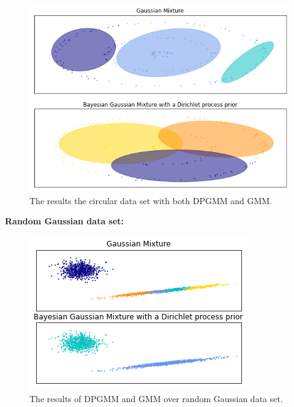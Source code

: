 \documentclass[12pt, a4paper]{paper}
\begin{document}
\begin{figure}[h!]
\centering
\includegraphics[scale=0.5]{cir_DPGMM.png}
\caption{The results the circular data set with both DPGMM and GMM.}
\label{fig:Circular_3}
\end{figure}


\textbf{Random Gaussian data set:}

\begin{figure}[h!]
\centering
\includegraphics[scale=0.9]{DPGMM.png}
\caption{The results of DPGMM and GMM over random Gaussian data set.}
\label{fig:Circular_3}
\end{figure}

\newpage



\end{document}

